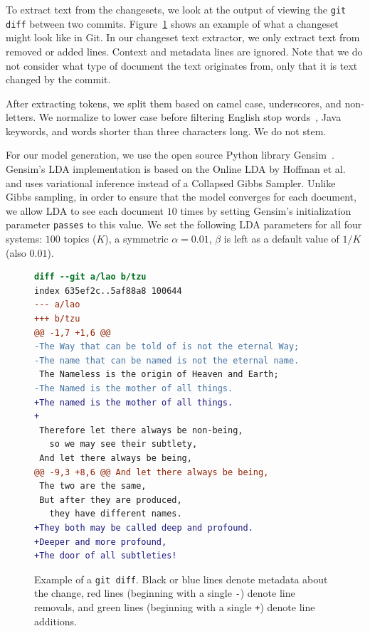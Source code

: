 To extract text from the changesets, we look at the output of viewing
the \texttt{git diff} between two commits.
Figure~\ref{fig:diff} shows an example of what a changeset might look
like in Git.
In our changeset text extractor, we only extract text from removed or added lines.
Context and metadata lines are ignored.
Note that we do not consider what type of document the text originates from,
only that it is text changed by the commit.

After extracting tokens, we split them based on camel case, underscores, and non-letters.
We normalize to lower case before filtering English stop words~\cite{StopWords}, Java keywords, and words shorter than three characters long.
We do not stem.


For our model generation, we use the open source Python library Gensim~\cite{Gensim}.
Gensim's LDA implementation is based on the Online LDA by Hoffman et al.~\cite{Hoffman-etal:2010}
and uses variational inference instead of a Collapsed Gibbs Sampler.
Unlike Gibbs sampling, in order to ensure that the model converges for each document,
we allow LDA to see each document $10$ times by setting Gensim's initialization parameter \texttt{passes} to this value.
We set the following LDA parameters for all four systems:
$100$ topics ($K$),
a symmetric $\alpha=0.01$,
$\beta$ is left as a default value of $1/K$ (also $0.01$).


\begin{figure}[ht]
\centering
\footnotesize
\begin{lstlisting}[language=diff, basicstyle=\ttfamily]
diff --git a/lao b/tzu
index 635ef2c..5af88a8 100644
--- a/lao
+++ b/tzu
@@ -1,7 +1,6 @@
-The Way that can be told of is not the eternal Way;
-The name that can be named is not the eternal name.
 The Nameless is the origin of Heaven and Earth;
-The Named is the mother of all things.
+The named is the mother of all things.
+
 Therefore let there always be non-being,
   so we may see their subtlety,
 And let there always be being,
@@ -9,3 +8,6 @@ And let there always be being,
 The two are the same,
 But after they are produced,
   they have different names.
+They both may be called deep and profound.
+Deeper and more profound,
+The door of all subtleties!
\end{lstlisting}
\caption{Example of a \texttt{git diff}. Black or blue lines denote metadata about the change, red lines (beginning with a single \texttt{-}) denote line removals, and green lines (beginning with a single \texttt{+}) denote line additions.}
\label{fig:diff}
\end{figure}

